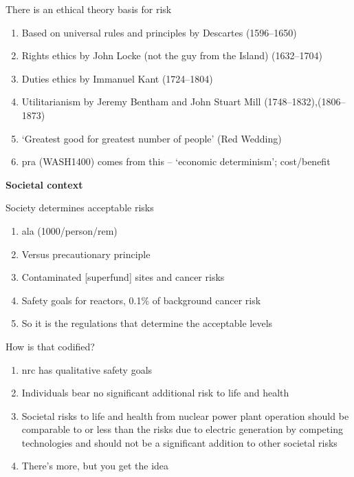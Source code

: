 \documentclass[aspectratio=1610,pdftex,dvipsnames,compress,xcolor={dvipsnames}]{beamer}
\newcommand{\acf}{\acrfull} %
\newcommand{\acs}{\acrshort} %
\begin{document}
\addtocounter{framenumber}{-1}
\begin{frame}{There is an ethical theory basis for risk}
    \begin{enumerate}[series=outerlist,topsep=0pt,itemsep=21pt,leftmargin=*,label=(\arabic*)]
        \item[]Based on universal rules and principles by Descartes (1596--1650)
        \item[]Rights ethics by John Locke (not the guy from the Island) (1632--1704)
        \item[]Duties ethics by Immanuel Kant (1724--1804)
        \item[]Utilitarianism by Jeremy Bentham and John Stuart Mill (1748--1832),(1806--1873)
        \item[]`Greatest good for greatest number of people' (Red Wedding)
        \item[]\acs{pra} (WASH1400) comes from this -- `economic determinism'; cost/benefit
    \end{enumerate}
\end{frame}


\begin{frame}[plain]{}
    \centering\LARGE\textbf{Societal context}
\end{frame}


\addtocounter{framenumber}{-1}
\begin{frame}{Society determines acceptable risks}
    \begin{enumerate}[series=outerlist,topsep=0pt,itemsep=21pt,leftmargin=*,label=(\arabic*)]
        \item[]\acf{ala} (1000/person/rem)
        \item[]Versus precautionary principle
        \item[]Contaminated [superfund] sites and cancer risks
        \item[]Safety goals for reactors, 0.1\% of background cancer risk
        \item[]So it is the regulations that determine the acceptable levels
    \end{enumerate}
\end{frame}


\begin{frame}{How is that codified?}
    \begin{enumerate}[series=outerlist,topsep=0pt,itemsep=21pt,leftmargin=*,label=(\arabic*)]
        \item[]\acs{nrc} has qualitative safety goals
        \item[]Individuals bear no significant additional risk to life and health
        \item[]Societal risks to life and health from nuclear power plant operation should be comparable to or less than the risks due to electric generation by competing technologies and should not be a significant addition to other societal risks
        \item[]There’s more, but you get the idea
    \end{enumerate}
\end{frame}
\end{document}
